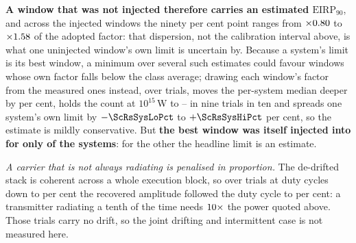 \textbf{A window that was not injected therefore carries an estimated
$\mathrm{EIRP}_{90}$}, and across the injected windows the ninety per cent
point ranges from $\times0.80$ to $\times1.58$ of the
adopted factor: that dispersion, not the calibration interval above, is what
one uninjected window's own limit is uncertain by. Because a system's limit is
its best window, a minimum over several such estimates could favour windows
whose own factor falls below the class average; drawing each window's factor
from the \SensNInj{} measured ones instead, over \ScRsNTrial{} trials, moves
the per-system median deeper by \ScRsMedShiftPct{} per cent, holds the count
at $10^{15}$\,W to \ScRsNLo--\ScRsNHi{} in nine trials in ten and spreads one
system's own limit by $-\ScRsSysLoPct$ to $+\ScRsSysHiPct$ per cent, so the
estimate is mildly conservative. But \textbf{the best window was itself injected into for only
\SmcNMeasSys{} of the \NSysClassA{} systems}: for the other \SmcNEstSys{} the
headline limit is an estimate.

\emph{A carrier that is not always radiating is penalised in proportion.} The
de-drifted stack is coherent across a whole execution block, so over
\DutyNTrial{} trials at duty cycles down to \DutyCycleMinPct{} per cent the
recovered amplitude followed the duty cycle to \DutyAttenDevPct{} per cent: a
transmitter radiating a tenth of the time needs $10\times$ the power
quoted above. Those trials carry no drift, so the joint drifting and
intermittent case is not measured here.

\begin{table}
\centering
\scriptsize
\caption{What sets $\mathrm{EIRP}_{90}$, and in which direction. The
uncertainty on the calibration is an uncertainty on the class-average factor,
and so on any statistic formed over many windows; its flux term is
band-dependent, so the submillimetre windows carry the larger combined
figure. The spread between windows
is an observed dispersion and is the statement about one window's own limit;
the signed terms are biases, stated with their direction rather than folded
into an error bar, and the decorrelation term is measured in \SensDecorNBlk{}
of the \SensDecorNBlkTot{} blocks and not imputed to the rest.}
\label{tab:p90budget}
\tiny
\setlength{\tabcolsep}{2pt}

\end{table}

